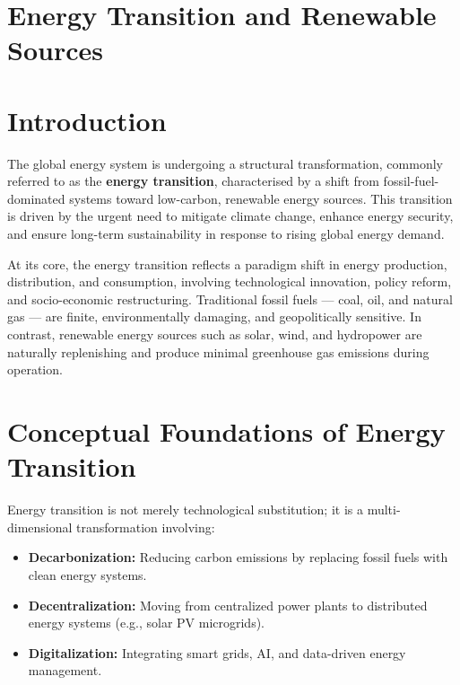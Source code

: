 \documentclass[12pt,a4paper]{article}
\begin{document}
\section*{Energy Transition and Renewable Sources}

\section{Introduction}

The global energy system is undergoing a structural transformation, commonly referred to as the \textbf{energy transition}, characterised by a shift from fossil-fuel-dominated systems toward low-carbon, renewable energy sources. This transition is driven by the urgent need to mitigate climate change, enhance energy security, and ensure long-term sustainability in response to rising global energy demand.

At its core, the energy transition reflects a paradigm shift in energy production, distribution, and consumption, involving technological innovation, policy reform, and socio-economic restructuring. Traditional fossil fuels --- coal, oil, and natural gas --- are finite, environmentally damaging, and geopolitically sensitive. In contrast, renewable energy sources such as solar, wind, and hydropower are naturally replenishing and produce minimal greenhouse gas emissions during operation.

\section{Conceptual Foundations of Energy Transition}

Energy transition is not merely technological substitution; it is a multi-dimensional transformation involving:
\begin{itemize}
    \item \textbf{Decarbonization:} Reducing carbon emissions by replacing fossil fuels with clean energy systems.
    \item \textbf{Decentralization:} Moving from centralized power plants to distributed energy systems (e.g., solar PV microgrids).
    \item \textbf{Digitalization:} Integrating smart grids, AI, and data-driven energy management.
\end{itemize}
\end{document}
